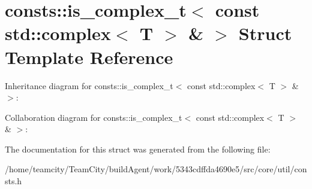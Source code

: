 \hypertarget{structconsts_1_1is__complex__t_3_01const_01std_1_1complex_3_01T_01_4_01_6_01_4}{}\section{consts\+:\+:is\+\_\+complex\+\_\+t$<$ const std\+:\+:complex$<$ T $>$ \& $>$ Struct Template Reference}
\label{structconsts_1_1is__complex__t_3_01const_01std_1_1complex_3_01T_01_4_01_6_01_4}


Inheritance diagram for consts\+:\+:is\+\_\+complex\+\_\+t$<$ const std\+:\+:complex$<$ T $>$ \& $>$\+:


Collaboration diagram for consts\+:\+:is\+\_\+complex\+\_\+t$<$ const std\+:\+:complex$<$ T $>$ \& $>$\+:


The documentation for this struct was generated from the following file\+:\begin{DoxyCompactItemize}
\item 
/home/teamcity/\+Team\+City/build\+Agent/work/5343cdffda4690e5/src/core/util/consts.\+h\end{DoxyCompactItemize}

